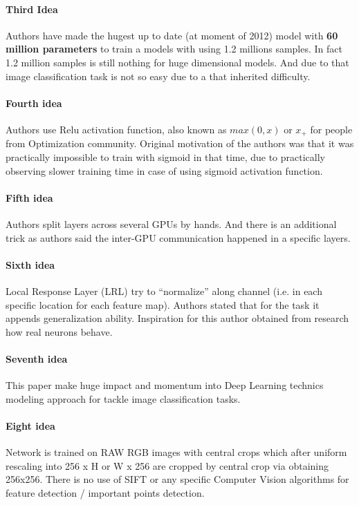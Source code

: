 \documentclass[12pt,a4paper]{article}
\theoremstyle{plain}
\begin{document}
\paragraph{Third Idea} Authors have made the hugest up to date (at moment of 2012) model with \textbf{60 million parameters} to train a models with using 1.2 millions samples. In fact 1.2 million samples is still nothing for huge dimensional models. And due to that image classification task is not so easy due to a that inherited difficulty.
 
\paragraph{Fourth idea} Authors use Relu activation function, also known as $max(0,x)$ or $x_{+}$ for people from Optimization community. Original motivation of the authors was that it was practically impossible to train with sigmoid in that time, due to practically observing slower training time in case of using sigmoid activation function.

\paragraph{Fifth idea} Authors split layers across several GPUs by hands. And there is an additional trick as authors said the inter-GPU communication happened in a specific layers.

\paragraph{Sixth idea} Local Response Layer (LRL) try to “normalize” along channel (i.e. in each specific location for each feature map). Authors stated that for the task it appends generalization ability. Inspiration for this author obtained from research how real neurons behave.

\paragraph{Seventh idea} This paper make huge impact and momentum into Deep Learning technics modeling approach for tackle image classification tasks.

\paragraph{Eight idea} Network is trained on RAW RGB images with central crops which after uniform rescaling into 256 x H or W x 256 are cropped by central crop via obtaining 256x256. There is no use of SIFT or any specific Computer Vision algorithms for feature detection / important points detection.
\end{document}
